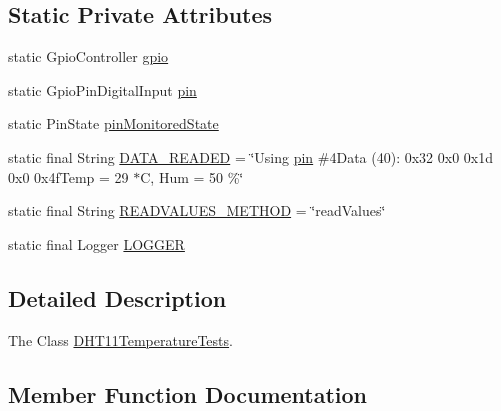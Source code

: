 \subsection*{Static Private Attributes}
\begin{DoxyCompactItemize}
\item 
static Gpio\+Controller \hyperlink{classcom_1_1libsensorj_1_1concretesensor_1_1test_1_1DHT11TemperatureTests_a7de266694c33835d976bfcd36c973ab6}{gpio}
\item 
static Gpio\+Pin\+Digital\+Input \hyperlink{classcom_1_1libsensorj_1_1concretesensor_1_1test_1_1DHT11TemperatureTests_a539cfe245f8a95e61ba9fbee05ae4f22}{pin}
\item 
static Pin\+State \hyperlink{classcom_1_1libsensorj_1_1concretesensor_1_1test_1_1DHT11TemperatureTests_a0b1e8ff10deeef685ecc52fe4254e239}{pin\+Monitored\+State}
\item 
static final String \hyperlink{classcom_1_1libsensorj_1_1concretesensor_1_1test_1_1DHT11TemperatureTests_a59d2eecae4aa5084dfdc56ec6ddad4c4}{D\+A\+T\+A\+\_\+\+R\+E\+A\+D\+E\+D} = \char`\"{}Using \hyperlink{classcom_1_1libsensorj_1_1concretesensor_1_1test_1_1DHT11TemperatureTests_a539cfe245f8a95e61ba9fbee05ae4f22}{pin} \#4\+Data (40)\+: 0x32 0x0 0x1d 0x0 0x4f\+Temp = 29 $\ast$\+C, Hum = 50 \%\char`\"{}
\item 
static final String \hyperlink{classcom_1_1libsensorj_1_1concretesensor_1_1test_1_1DHT11TemperatureTests_a2e6886cd64d8982ff792d10404bca66f}{R\+E\+A\+D\+V\+A\+L\+U\+E\+S\+\_\+\+M\+E\+T\+H\+O\+D} = \char`\"{}read\+Values\char`\"{}
\item 
static final Logger \hyperlink{classcom_1_1libsensorj_1_1concretesensor_1_1test_1_1DHT11TemperatureTests_a12743e84b5d8a4c300c1ef20c6f7eed4}{L\+O\+G\+G\+E\+R}
\end{DoxyCompactItemize}


\subsection{Detailed Description}
The Class \hyperlink{classcom_1_1libsensorj_1_1concretesensor_1_1test_1_1DHT11TemperatureTests}{D\+H\+T11\+Temperature\+Tests}. 

\subsection{Member Function Documentation}
\hypertarget{classcom_1_1libsensorj_1_1concretesensor_1_1test_1_1DHT11TemperatureTests_a1bc150d93e863d5d10ec0a16ae44779b}{}
